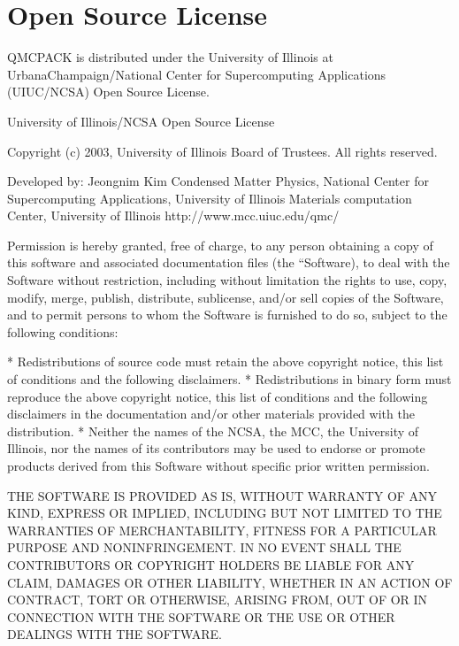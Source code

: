 \documentclass[letterpaper,10pt,english]{sphinxmanual}
\begin{document}
\section{Open Source License}
\label{\detokenize{introduction:open-source-license}}\label{\detokenize{introduction:license}}
QMCPACK is distributed under the University of Illinois at
Urbana\sphinxhyphen{}Champaign/National Center for Supercomputing Applications
(UIUC/NCSA) Open Source License.

\begin{sphinxVerbatim}[commandchars=\\\{\}]
          University of Illinois/NCSA Open Source License

Copyright (c) 2003, University of Illinois Board of Trustees.
All rights reserved.

Developed by:
  Jeongnim Kim
  Condensed Matter Physics,
  National Center for Supercomputing Applications, University of Illinois
  Materials computation Center, University of Illinois
  http://www.mcc.uiuc.edu/qmc/

Permission is hereby granted, free of charge, to any person obtaining a
copy of this software and associated documentation files (the
``Software\PYGZsq{}\PYGZsq{}), to deal with the Software without restriction, including
without limitation the rights to use, copy, modify, merge, publish,
distribute, sublicense, and/or sell copies of the Software, and to
permit persons to whom the Software is furnished to do so, subject to
the following conditions:

        * Redistributions of source code must retain the above copyright
          notice, this list of conditions and the following disclaimers.
        * Redistributions in binary form must reproduce the above copyright
          notice, this list of conditions and the following disclaimers in
          the documentation and/or other materials provided with the
          distribution.
        * Neither the names of the NCSA, the MCC, the University of Illinois,
          nor the names of its contributors may be used to endorse or promote
          products derived from this Software without specific prior written
          permission.

THE SOFTWARE IS PROVIDED \PYGZdq{}AS IS\PYGZdq{}, WITHOUT WARRANTY OF ANY KIND, EXPRESS
OR IMPLIED, INCLUDING BUT NOT LIMITED TO THE WARRANTIES OF MERCHANTABILITY,
FITNESS FOR A PARTICULAR PURPOSE AND NONINFRINGEMENT. IN NO EVENT SHALL
THE CONTRIBUTORS OR COPYRIGHT HOLDERS BE LIABLE FOR ANY CLAIM, DAMAGES OR
OTHER LIABILITY, WHETHER IN AN ACTION OF CONTRACT, TORT OR OTHERWISE,
ARISING FROM, OUT OF OR IN CONNECTION WITH THE SOFTWARE OR THE USE OR
OTHER DEALINGS WITH THE SOFTWARE.
\end{sphinxVerbatim}
\end{document}
